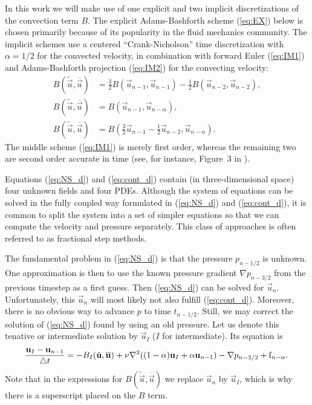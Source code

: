 In this work we will make use of one explicit and two
implicit discretizations of the convection term $B$.
The explicit  Adams-Bashforth scheme
(\ref{eq:EX}) below is chosen primarily because of its
popularity in the fluid mechanics community. The implicit schemes use
a centered ``Crank-Nicholson'' time discretization with $\alpha=1/2$
for the convected velocity,
in combination with
forward
Euler (\ref{eq:IM1}) and Adams-Bashforth projection (\ref{eq:IM2}) for
the convecting velocity:
\begin{align}
\label{eq:EX}
B(\tilde{\vec{u}},\overline{\vec{u}}) &=
\frac{3}{2}B(\vec{u}_{n-1},\vec{u}_{n-1})-
\frac{1}{2}B(\vec{u}_{n-2},\vec{u}_{n-2}), \\
\label{eq:IM1}
B(\tilde{\vec{u}},\overline{\vec{u}}) &=
B(\vec{u}_{n-1},\vec{u}_{n-\alpha}), \\
 \label{eq:IM2}
B(\tilde{\vec{u}},\overline{\vec{u}}) &=
B(\frac{3}{2}\vec{u}_{n-1}-\frac{1}{2}\vec{u}_{n-2},\vec{u}_{n-\alpha}).
\end{align}
The middle scheme (\ref{eq:IM1}) is merely first order,
whereas the remaining two are second order accurate in time
(see, for instance, Figure~3 in \cite{SimoArmero1994}).

Equations (\ref{eq:NS_d}) and (\ref{eq:cont_d}) contain (in
three-dimensional space) four unknown fields and four PDEs.
Although the system of equations can be solved in the fully coupled
way formulated in  (\ref{eq:NS_d}) and (\ref{eq:cont_d}),
it is common to split the system into a set of simpler equations
so that we can compute the velocity and pressure separately.
This class of approaches is often referred to as fractional step
methods.

The fundamental problem in (\ref{eq:NS_d}) is that the pressure
$p_{n-1/2}$ is unknown. One approximation is then to use the
known pressure gradient $\nabla p_{n-3/2}$ from the previous timestep as a first guess. Then (\ref{eq:NS_d}) can
be solved for $\vec{u}_n$. Unfortunately, this $\vec{u}_n$ will most
likely not also fulfill
(\ref{eq:cont_d}). Moreover, there is no obvious way to advance $p$
to time $t_{n-1/2}$. Still, we may correct the solution of (\ref{eq:NS_d})
found by using an old pressure. Let us denote this tenative or
intermediate solution
by $\vec{u}_I$ ($I$ for intermediate). Its equation is
\begin{equation}
\label{eq:NS_FS}
\frac{{\vec{u}}_{I}-\vec{u}_{n-1}}{\triangle t} =
- B_I(\tilde{\vec{u}},\overline{\vec{u}}) +
\nu \nabla^2 ((1-\alpha) {\vec{u}}_{I} + \alpha \vec{u}_{n-1})
-\nabla p_{n-3/2} + \text{f}_{n-\alpha} . \thinspace
\end{equation}
Note that in the expressions for $B(\tilde{\vec{u}},\overline{\vec{u}})$
we replace $\vec{u}_n$ by $\vec{u}_I$, which is why there is
a superscript placed on the $B$ term.

